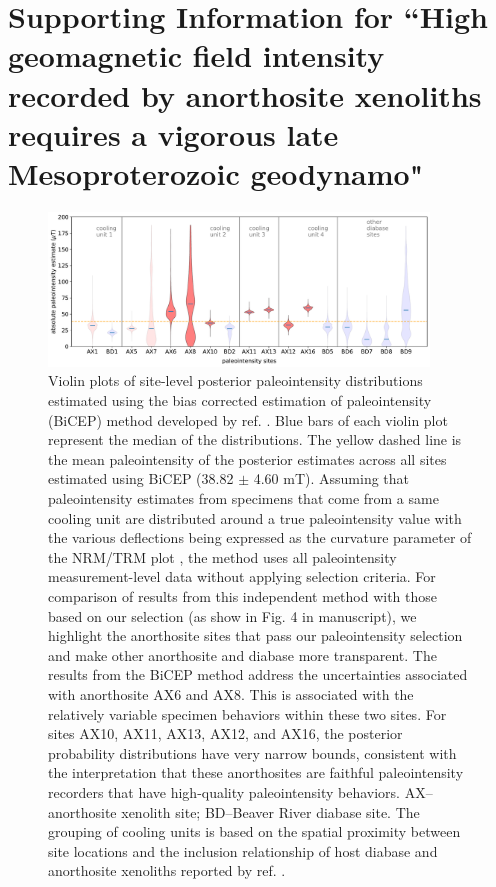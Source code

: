 \chapter[Supporting Information for ``High geomagnetic field intensity recorded by anorthosite xenoliths requires a vigorous late Mesoproterozoic geodynamo"][Supporting Information--Late Mesoproterozoic Geodynamo]{Supporting Information for ``High geomagnetic field intensity recorded by anorthosite xenoliths requires a vigorous late Mesoproterozoic geodynamo"}


\begin{figure}
\noindent\includegraphics[width=0.9\textwidth]{figure/Zhang2022/PINT_BiCEP.pdf}
\centering
\caption[Beaver River anorthosite and diabase paleointensity estimates based on the BiCEP method]{Violin plots of site-level posterior paleointensity distributions estimated using the bias corrected estimation of paleointensity (BiCEP) method developed by ref. \citealp{Cych2021a}. Blue bars of each violin plot represent the median of the distributions. The yellow dashed line is the mean paleointensity of the posterior estimates across all sites estimated using BiCEP (38.82 $\pm$ 4.60 mT). Assuming that paleointensity estimates from specimens that come from a same cooling unit are distributed around a true paleointensity value with the various deflections being expressed as the curvature parameter of the NRM/TRM plot \cite{Arai1963a, Paterson2011a}, the method uses all paleointensity measurement-level data without applying selection criteria. For comparison of results from this independent method with those based on our selection (as show in Fig. 4 in manuscript), we highlight the anorthosite sites that pass our paleointensity selection and make other anorthosite and diabase more transparent. The results from the BiCEP method address the uncertainties associated with anorthosite AX6 and AX8. This is associated with the relatively variable specimen behaviors within these two sites. For sites AX10, AX11, AX13, AX12, and AX16, the posterior probability distributions have very narrow bounds, consistent with the interpretation that these anorthosites are faithful paleointensity recorders that have high-quality paleointensity behaviors. AX--anorthosite xenolith site; BD--Beaver River diabase site. The grouping of cooling units is based on the spatial proximity between site locations and the inclusion relationship of host diabase and anorthosite xenoliths reported by ref. \citealp{Zhang2021b}.}
\label{fig:PINT_BiCEP}
\end{figure}

